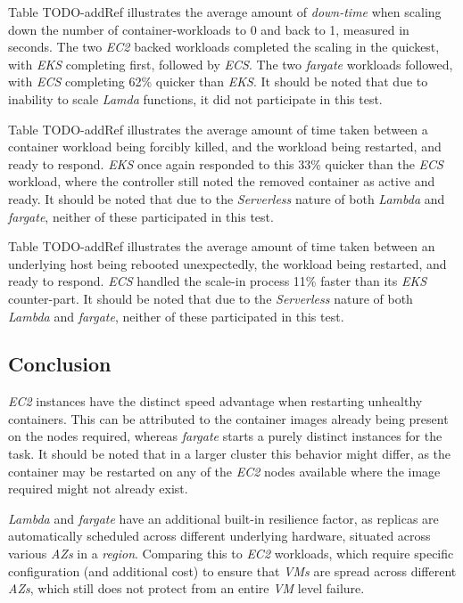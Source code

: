 Table TODO-addRef illustrates the average amount of \textit{down-time} when scaling down the number of container-workloads to 0 and back to 1, measured in seconds.
The two \textit{EC2} backed workloads completed the scaling in the quickest, with \textit{EKS} completing first, followed by \textit{ECS}.
The two \textit{fargate} workloads followed, with \textit{ECS} completing 62\% quicker than \textit{EKS}.
It should be noted that due to inability to scale \textit{Lamda} functions, it did not participate in this test.

Table TODO-addRef illustrates the average amount of time taken between a container workload being forcibly killed, and the workload being restarted, and ready to respond.
\textit{EKS} once again responded to this 33\% quicker than the \textit{ECS} workload, where the controller still noted the removed container as active and ready.
It should be noted that due to the \textit{Serverless} nature of both \textit{Lambda} and \textit{fargate}, neither of these participated in this test.

Table TODO-addRef illustrates the average amount of time taken between an underlying host being rebooted unexpectedly, the workload being restarted, and ready to respond.
\textit{ECS} handled the scale-in process 11\% faster than its \textit{EKS} counter-part.
It should be noted that due to the \textit{Serverless} nature of both \textit{Lambda} and \textit{fargate}, neither of these participated in this test.

\subsection*{Conclusion}
\textit{EC2} instances have the distinct speed advantage when restarting unhealthy containers.
This can be attributed to the container images already being present on the nodes required, whereas \textit{fargate} starts a purely distinct instances for the task.
It should be noted that in a larger cluster this behavior might differ, as the container may be restarted on any of the \textit{EC2} nodes available where the image required might not already exist.

\textit{Lambda} and \textit{fargate} have an additional built-in resilience factor, as replicas are automatically scheduled across different underlying hardware, situated across various \textit{AZs} in a \textit{region}.
Comparing this to \textit{EC2} workloads, which require specific configuration (and additional cost) to ensure that \textit{VMs} are spread across different \textit{AZs},
which still does not protect from an entire \textit{VM} level failure.


